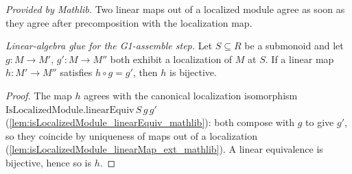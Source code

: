 \begin{lemma}
  \label{lem:isLocalizedModule_linearMap_ext_mathlib}
  \mathlibok
  \textit{Provided by Mathlib.}
  Two linear maps out of a localized module agree as soon as they agree after precomposition with
  the localization map.
\end{lemma}


\begin{lemma}
  \label{lem:bijective_comp_of_localizations}
  \textit{Linear-algebra glue for the G1-assemble step.}
  Let \(S \subseteq R\) be a submonoid and let \(g : M \to M'\), \(g' : M \to M''\) both exhibit a
  localization of \(M\) at \(S\). If a linear map \(h : M' \to M''\) satisfies \(h \circ g = g'\),
  then \(h\) is bijective.
\end{lemma}
\begin{proof}
  The map \(h\) agrees with the canonical localization isomorphism
  \(\mathrm{IsLocalizedModule.linearEquiv}\,S\,g\,g'\)
  (\cref{lem:isLocalizedModule_linearEquiv_mathlib}): both compose with \(g\) to give \(g'\), so they
  coincide by uniqueness of maps out of a localization
  (\cref{lem:isLocalizedModule_linearMap_ext_mathlib}). A linear equivalence is bijective, hence so
  is \(h\).
\end{proof}

